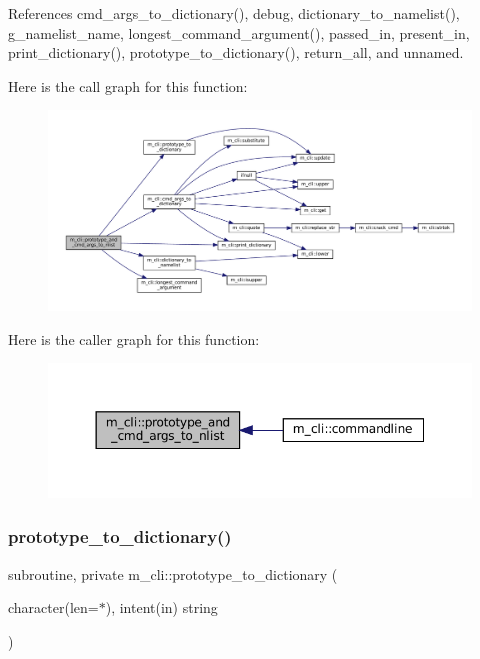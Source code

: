 References cmd\+\_\+args\+\_\+to\+\_\+dictionary(), debug, dictionary\+\_\+to\+\_\+namelist(), g\+\_\+namelist\+\_\+name, longest\+\_\+command\+\_\+argument(), passed\+\_\+in, present\+\_\+in, print\+\_\+dictionary(), prototype\+\_\+to\+\_\+dictionary(), return\+\_\+all, and unnamed.

Here is the call graph for this function\+:
\nopagebreak
\begin{figure}[H]
\begin{center}
\leavevmode
\includegraphics[width=350pt]{namespacem__cli_ac77d70573b34ade2079cc4004a6acba5_cgraph}
\end{center}
\end{figure}
Here is the caller graph for this function\+:
\nopagebreak
\begin{figure}[H]
\begin{center}
\leavevmode
\includegraphics[width=350pt]{namespacem__cli_ac77d70573b34ade2079cc4004a6acba5_icgraph}
\end{center}
\end{figure}
\mbox{\label{namespacem__cli_a8c62537a2d224364c9cb30005be819e9}} 
\subsubsection{\texorpdfstring{prototype\+\_\+to\+\_\+dictionary()}{prototype\_to\_dictionary()}}
{\footnotesize\ttfamily subroutine, private m\+\_\+cli\+::prototype\+\_\+to\+\_\+dictionary (\begin{DoxyParamCaption}\item[{character(len=$\ast$), intent(in)}]{string }\end{DoxyParamCaption})\hspace{0.3cm}{\ttfamily [private]}}



